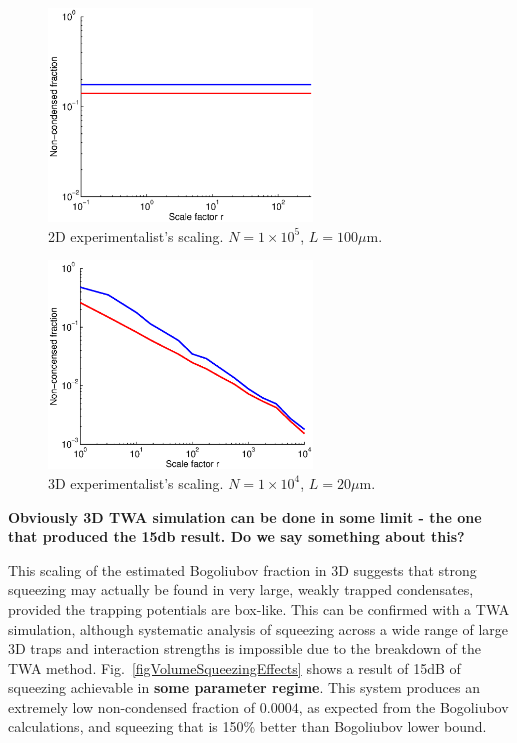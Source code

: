 \documentclass{iopart}
\begin{document}
\begin{figure}
  \centering
   \includegraphics[width=7cm]{figures/2D_Bog_mode_occupation_scaling.eps}
\caption{2D experimentalist's scaling. $N=1\times 10^5$, $L=100\mu$m.}
 \label{fig2D_Bog_mode_occupation_scaling}
\end{figure}

\begin{figure}
  \centering
   \includegraphics[width=7cm]{figures/3D_Bog_mode_occupation_scaling.eps}
\caption{3D experimentalist's scaling. $N=1\times 10^4$, $L=20\mu$m.}
 \label{fig3D_Bog_mode_occupation_scaling}
\end{figure}

\textbf{Obviously 3D TWA simulation can be done in some limit - the one that produced the 15db result.  Do we say something about this?} 

This scaling of the estimated Bogoliubov fraction in 3D suggests that strong squeezing may actually be found in very large, weakly trapped condensates, provided the trapping potentials are box-like.  This can be confirmed with a TWA simulation, although systematic analysis of squeezing across a wide range of large 3D traps and interaction strengths is impossible due to the breakdown of the TWA method.  Fig.~\ref{figVolumeSqueezingEffects} shows a result of 15dB of squeezing achievable in \textbf{some parameter regime}.  This system produces an extremely low non-condensed fraction of $0.0004$, as expected from the Bogoliubov calculations, and squeezing that is 150\% better than Bogoliubov lower bound.  
\end{document}
